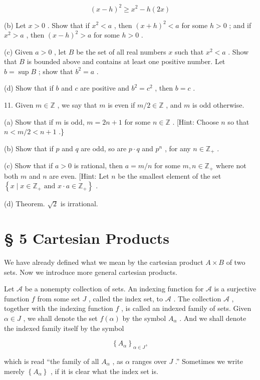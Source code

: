 \[
{\left( x - h\right) }^{2} \geq  {x}^{2} - h\left( {2x}\right)
\]

(b) Let \(x > 0\) . Show that if \({x}^{2} < a\) , then \({\left( x + h\right) }^{2} < a\) for some \(h > 0\) ; and if \({x}^{2} > a\) , then \({\left( x - h\right) }^{2} > a\) for some \(h > 0\) .

(c) Given \(a > 0\) , let \(B\) be the set of all real numbers \(x\) such that \({x}^{2} < a\) . Show that \(B\) is bounded above and contains at least one positive number. Let \(b = \sup B\) ; show that \({b}^{2} = a\) .

(d) Show that if \(b\) and \(c\) are positive and \({b}^{2} = {c}^{2}\) , then \(b = c\) .

11. Given \(m \in  \mathbb{Z}\) , we say that \(m\) is even if \(m/2 \in  \mathbb{Z}\) , and \(m\) is odd otherwise.

(a) Show that if \(m\) is odd, \(m = {2n} + 1\) for some \(n \in  \mathbb{Z}\) . [Hint: Choose \(n\) so that \(n < m/2 < n + 1\) .\}

(b) Show that if \(p\) and \(q\) are odd, so are \(p \cdot  q\) and \({p}^{n}\) , for any \(n \in  {\mathbb{Z}}_{ + }\) .

(c) Show that if \(a > 0\) is rational, then \(a = m/n\) for some \(m,n \in  {\mathbb{Z}}_{ + }\) where not both \(m\) and \(n\) are even. [Hint: Let \(n\) be the smallest element of the set \(\left\{  {x \mid  x \in  {\mathbb{Z}}_{ + }\text{ and }x \cdot  a \in  {\mathbb{Z}}_{ + }}\right\}\) .

(d) Theorem. \(\sqrt{2}\) is irrational.

\section*{§ 5 Cartesian Products}

We have already defined what we mean by the cartesian product \(A \times  B\) of two sets. Now we introduce more general cartesian products.

\begin{definition} Let \(\mathcal{A}\) be a nonempty collection of sets. An indexing function for \(\mathcal{A}\) is a surjective function \(f\) from some set \(J\) , called the index set, to \(\mathcal{A}\) . The collection \(\mathcal{A}\) , together with the indexing function \(f\) , is called an indexed family of sets. Given \(\alpha  \in  J\) , we shall denote the set \(f\left( \alpha \right)\) by the symbol \({A}_{\alpha }\) . And we shall denote the indexed family itself by the symbol

\[
{\left\{  {A}_{\alpha }\right\}  }_{\alpha  \in  J},
\]

which is read ``the family of all \({A}_{\alpha }\) , as \(\alpha\) ranges over \(J\) .'' Sometimes we write merely \(\left\{  {A}_{\alpha }\right\}\) , if it is clear what the index set is.
\end{definition}

